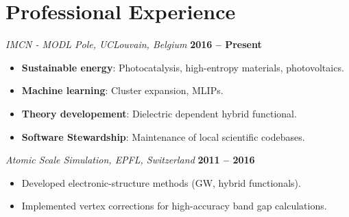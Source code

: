 \documentclass[a4paper,11pt,oneside]{article}
\begin{document}

\section*{Professional Experience}

\textit{IMCN - MODL Pole, UCLouvain, Belgium} \hfill \textbf{2016 -- Present}
\vspace{1pt}
\begin{itemize}[leftmargin=*, nosep, itemsep=3pt]
    \item \textbf{Sustainable energy}: Photocatalysis, high-entropy materials, photovoltaics.
    \item \textbf{Machine learning}: Cluster expansion, MLIPs.
    \item \textbf{Theory developement}: Dielectric dependent hybrid functional.
    \item \textbf{Software Stewardship}: Maintenance of local scientific codebases.
\end{itemize}

\vspace{4mm}
\textit{Atomic Scale Simulation, EPFL, Switzerland} \hfill \textbf{2011 -- 2016}
\vspace{1pt}
\begin{itemize}[leftmargin=*, nosep]
    \item Developed electronic-structure methods (GW, hybrid functionals).
    \item Implemented vertex corrections for high-accuracy band gap calculations.
\end{itemize}
\end{document}
